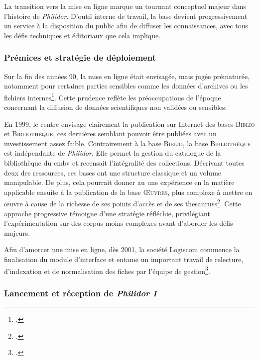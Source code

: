 La transition vers la mise en ligne marque un tournant conceptuel majeur dans l'histoire de \textit{Philidor}. D'outil interne de travail, la base devient progressivement un service à la disposition du public afin de diffuser les connaissances, avec tous les défis techniques et éditoriaux que cela implique.

\subsubsection{Prémices et stratégie de déploiement}

Sur la fin des années 90, la mise en ligne était envisagée, mais jugée prématurée, notamment pour certaines parties sensibles comme les données d'archives ou les fichiers internes\footcite[Conseil scientifique d'octobre 1997]{michelbenoitDocumentationTechniqueBibliographique1997}. Cette prudence reflète les préoccupations de l'époque concernant la diffusion de données scientifiques non validées ou sensibles.

En 1999, le centre envisage clairement la publication sur Internet des bases \textsc{Biblio} et \textsc{Bibliothèque}, ces dernières semblant pouvoir être publiées avec un investissement assez faible. Contrairement à la base \textsc{Biblio}, la base \textsc{Bibliothèque} est indépendante de \textit{Philidor}. Elle permet la gestion du catalogue de la bibliothèque du \gls{cmbv} et recensait l'intégralité des collections. Décrivant toutes deux des ressources, ces bases ont une structure classique et un volume manipulable. De plus, cela pourrait donner au  une expérience en la matière applicable ensuite à la publication de la base \textsc{Œuvres}, plus complexe à mettre en œuvre à cause de la richesse de ses points d'accès et de ses \glspl{thesaurus}\footcite[Conseil scientifique de février 1999]{michelbenoitDocumentationTechniqueBibliographique1997}. Cette approche progressive témoigne d'une stratégie réfléchie, privilégiant l'expérimentation sur des corpus moins complexes avant d'aborder les défis majeurs.

Afin d'amorcer une mise en ligne, dès 2001, la société Logiscom commence la finalisation du module d'interface et entame un important travail de relecture, d'indexation et de normalisation des fiches par l'équipe de gestion\footcite[Conseil scientifique, bilan de l'année 2001]{michelbenoitDocumentationTechniqueBibliographique1997}.

\subsubsection{Lancement et réception de \textit{Philidor I}}

